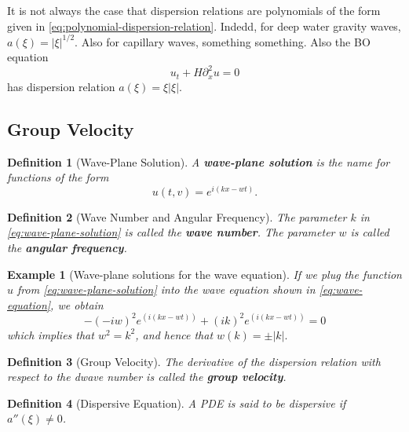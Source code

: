 \documentclass{article}
\newtheorem{definition}{Definition}
\newtheorem{example}{Example}
\begin{document}
It is not always the case that dispersion relations are polynomials of the form
given in \cref{eq:polynomial-dispersion-relation}. Indedd, for deep water
gravity waves, $a(\xi)= |\xi|^{1/2}$. Also for capillary waves, something
something. Also the BO equation
\begin{equation*}
  u_{t}+ H \partial_{x}^{2}u = 0
\end{equation*}
has dispersion relation $a(\xi)=\xi|\xi|$.
\subsection{Group Velocity}
\begin{definition}[Wave-Plane Solution]
  \label{def:wave-plane-solution}
  A \textbf{wave-plane solution} is the name for functions of the form
  \begin{equation}
    \label{eq:wave-plane-solution}
    u(t,v) = e^{i(kx-wt)}.
  \end{equation}
\end{definition}
\begin{definition}[Wave Number and Angular Frequency]
  \label{def:wave-number-angular-frequency}
  The parameter $k$ in \cref{eq:wave-plane-solution} is called the \textbf{wave
    number}. The parameter $w$ is called the \textbf{angular frequency}.
\end{definition}
\begin{example}[Wave-plane solutions for the wave equation]
  If we plug the function $u$ from \cref{eq:wave-plane-solution} into
  the wave equation shown in \cref{eq:wave-equation}, we obtain
  \begin{equation*}
    -(-iw)^{2}e^{(i(kx-wt))} +(ik)^{2}e^{(i(kx-wt))} =0
  \end{equation*}
  which implies that $w^{2}=k^{2}$, and hence that $w(k) = \pm |k|.$
\end{example}
\begin{definition}[Group Velocity]
  The derivative of the dispersion relation with respect to the dwave number is
  called the \textbf{group velocity}.
\end{definition}
\begin{definition}[Dispersive Equation]
  A PDE is said to be dispersive if $a''(\xi) \neq 0$. 
\end{definition}
\end{document}
